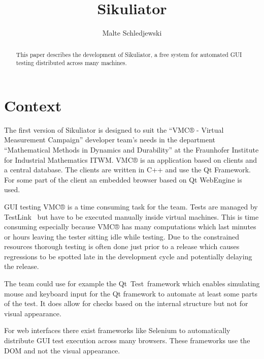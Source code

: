 \documentclass[a4paper,twocolumn]{article}
\title{Sikuliator}
\author{Malte Schledjewski}
\newcommand{\VMC}[0]{VMC®}
\newcommand{\Sik}[0]{Sikuliator}
\begin{document}


\maketitle
\begin{abstract}
	
	
	This paper describes the development of \Sik{}, 
	a free system for automated GUI testing distributed across many machines.
	
\end{abstract}
\listoftodos

\tableofcontents

\section{Context}

The first version of \Sik{} is designed to suit the 
\enquote{\VMC{} - Virtual Measurement Campaign} developer team's needs in the
department \enquote{Mathematical Methods in Dynamics and Durability} 
at the Fraunhofer Institute for Industrial Mathematics ITWM.
\VMC{} is an application based on clients and a central database.
The clients are written in C++ and use the Qt Framework.
For some part of the client an embedded browser based on Qt WebEngine is used.

GUI testing \VMC{} is a time consuming task for the team.
Tests are managed by TestLink~\cite{TestLink} but have to be executed manually inside virtual machines.
This is time consuming especially because \VMC{} has many computations which last minutes or hours 
leaving the tester sitting idle while testing.
Due to the constrained resources thorough testing is often done just prior to a release
which causes regressions to be spotted late in the development cycle and potentially delaying the release. 

The team could use for example the Qt~Test~framework\cite{QtTest} which enables simulating mouse and keyboard input for the Qt framework to automate at least some parts of the test.
It does allow for checks based on the internal structure but not for visual appearance.

For web interfaces there exist frameworks like Selenium\cite{Selenium} to automatically distribute GUI test execution across many browsers.
These frameworks use the DOM and not the visual appearance.
\end{document}
